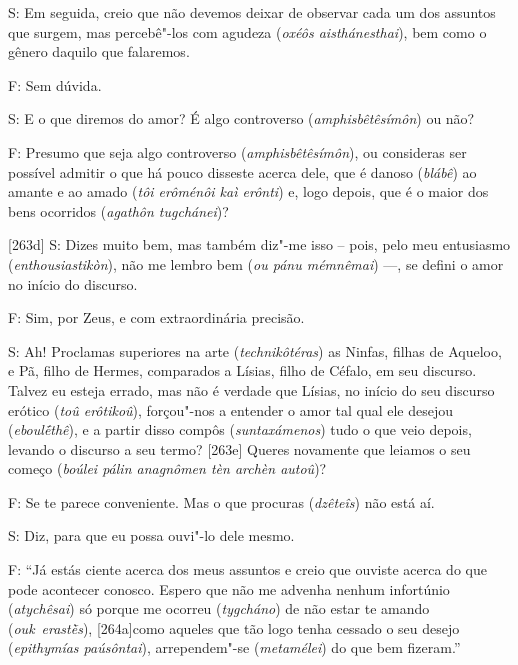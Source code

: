  

S: Em seguida, creio que não devemos deixar de observar cada um dos
assuntos que surgem, mas percebê"-los com agudeza (\emph{oxéôs
aisthánesthai}), bem como o gênero daquilo que falaremos.

 

F: Sem dúvida.

 

S: E o que diremos do amor? É algo controverso (\emph{amphisbêtêsímôn})
ou não?

 

F: Presumo que seja algo controverso (\emph{amphisbêtêsímôn}), ou
consideras ser possível admitir o que há pouco disseste acerca dele, que
é danoso (\emph{blábê}) ao amante e ao amado (\emph{tôi erôménôi kaì
erônti}) e, logo depois, que é o maior dos bens ocorridos (\emph{agathôn
tugchánei})?

 

[263d] S: Dizes muito bem, mas também diz"-me isso -- pois, pelo meu
entusiasmo (\emph{enthousiastikòn}), não me lembro bem (\emph{ou pánu
mémnêmai}) \mbox{---,} se defini o amor no início do discurso.

 

F: Sim, por Zeus, e com extraordinária precisão.

 

S: Ah! Proclamas superiores na arte (\emph{technikôtéras}) as Ninfas,
filhas de Aqueloo, e Pã, filho de Hermes, comparados a Lísias, filho de
Céfalo, em seu discurso. Talvez eu esteja errado, mas não é verdade que
Lísias, no início do seu discurso erótico (\emph{toû erôtikoû}),
forçou"-nos a entender o amor tal qual ele desejou (\emph{eboulḗthê}), e
a partir disso compôs (\emph{suntaxámenos}) tudo o que veio depois,
levando o discurso a seu termo? [263e] Queres novamente que leiamos
o seu começo (\emph{boúlei pálin anagnômen tèn archèn autoû})?

 

F: Se te parece conveniente. Mas o que procuras (\emph{dzêteîs}) não
está aí.

 

S: Diz, para que eu possa ouvi"-lo dele mesmo.

 

F: ``Já estás ciente acerca dos meus assuntos e creio que ouviste acerca
do que pode acontecer conosco. Espero que não me advenha nenhum
infortúnio (\emph{atychêsai}) só porque me ocorreu (\emph{tygcháno}) de
não estar te amando (\emph{ouk}~\emph{erastḕs}), [264a]como aqueles
que tão logo tenha cessado o seu desejo (\emph{epithymías paúsôntai}),
arrependem"-se (\emph{metamélei}) do que bem fizeram.''

